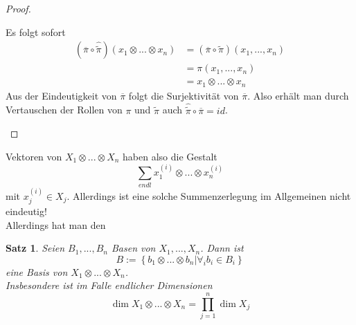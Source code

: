 \documentclass[12pt,a4paper]{article}
\newtheorem{theorem}{Satz}
\theoremstyle{definition}
\theoremstyle{remark}
\renewcommand{\bar}[1]{\overline{#1}}
\renewcommand{\hat}[1]{\widehat{#1}}
\begin{document}
\begin{proof}
\begin{proofenum}
\begin{center}
				\end{center}
				Es folgt sofort
				\begin{equation}
					\begin{split}
						\left( \bar{\pi} \circ \hat{\tilde{\pi}} \right) (x_1 \otimes ... \otimes x_n) &= \left( \bar{\pi} \circ \tilde{\pi} \right)(x_1,...,x_n) \\
						&= \pi(x_1,...,x_n) \\
						&= x_1 \otimes ... \otimes x_n
					\end{split}
				\end{equation}
				Aus der Eindeutigkeit von $\bar{\pi}$ folgt die Surjektivität von $\bar{\pi}$. Also erhält man durch Vertauschen der Rollen von $\pi$ und $\tilde{\pi}$ auch $\hat{\tilde{\pi}} \circ \bar{\pi} = id$.
		\end{proofenum}
	\end{proof}
	Vektoren von $X_1 \otimes ... \otimes X_n$ haben also die Gestalt
		\begin{equation}
			\sum_{endl} x_1^{(i)} \otimes ... \otimes x_n^{(i)}
		\end{equation}
		mit $x_j^{(i)} \in X_j$. Allerdings ist eine solche Summenzerlegung im Allgemeinen nicht eindeutig! \\
		Allerdings hat man den
		\begin{theorem}
			Seien $B_1,...,B_n$ Basen von $X_1,...,X_n$. Dann ist
			\begin{equation}
				B:= \left\{ b_1 \otimes ... \otimes b_n | \forall_i b_i \in B_i \right\}
			\end{equation}
			eine Basis von $X_1 \otimes ... \otimes X_n$. \\
			Insbesondere ist im Falle endlicher Dimensionen
			\begin{equation}
				\dim X_1 \otimes ... \otimes X_n = \prod_{j=1}^n \dim X_j
			\end{equation}
		\end{theorem}
\end{document}
